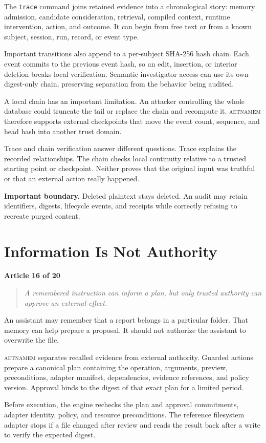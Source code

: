 \documentclass[11pt]{article}
\newcommand{\system}{\textsc{aetnamem}}
\newcommand{\articlelabel}[1]{%
  \noindent\colorbox{aetnaTeal!10}{%
    \parbox{0.96\textwidth}{\color{aetnaInk}\small\textbf{Article #1 of 20}}}%
  \par\medskip}
\newcommand{\coreidea}[1]{%
  \begin{quote}\color{aetnaTeal}\large\itshape #1\end{quote}}
\newcommand{\boundary}[1]{%
  \par\smallskip\noindent\textbf{Important boundary.} #1}
\begin{document}
The \texttt{trace} command joins retained evidence into a chronological story:
memory admission, candidate consideration, retrieval, compiled context,
runtime intervention, action, and outcome. It can begin from free text or from
a known subject, session, run, record, or event type.

Important transitions also append to a per-subject SHA-256 hash chain. Each
event commits to the previous event hash, so an edit, insertion, or interior
deletion breaks local verification. Semantic investigator access can use its
own digest-only chain, preserving separation from the behavior being audited.

A local chain has an important limitation. An attacker controlling the whole
database could truncate the tail or replace the chain and recompute it.
\system{} therefore supports external checkpoints that move the event count,
sequence, and head hash into another trust domain.

Trace and chain verification answer different questions. Trace explains the
recorded relationships. The chain checks local continuity relative to a
trusted starting point or checkpoint. Neither proves that the original input
was truthful or that an external action really happened.

\boundary{Deleted plaintext stays deleted. An audit may retain identifiers,
digests, lifecycle events, and receipts while correctly refusing to recreate
purged content.}

\clearpage
\section{Information Is Not Authority}
\articlelabel{16}
\coreidea{A remembered instruction can inform a plan, but only trusted
authority can approve an external effect.}

An assistant may remember that a report belongs in a particular folder. That
memory can help prepare a proposal. It should not authorize the assistant to
overwrite the file.

\system{} separates recalled evidence from external authority. Guarded actions
prepare a canonical plan containing the operation, arguments, preview,
preconditions, adapter manifest, dependencies, evidence references, and policy
version. Approval binds to the digest of that exact plan for a limited period.

Before execution, the engine rechecks the plan and approval commitments,
adapter identity, policy, and resource preconditions. The reference filesystem
adapter stops if a file changed after review and reads the result back after a
write to verify the expected digest.
\end{document}

